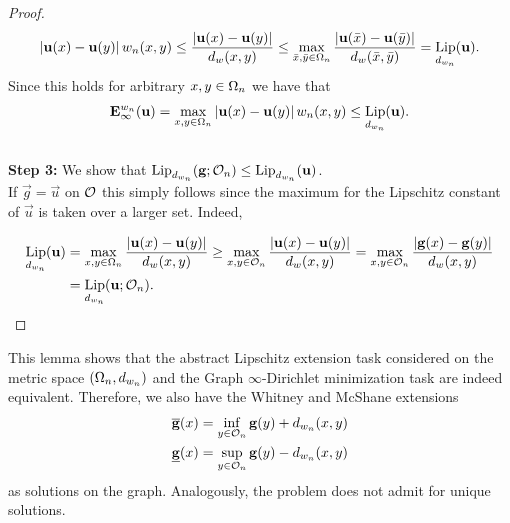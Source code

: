 \begin{proof}
%
\begin{align*}
\left|\mathbf{u}(x) - \mathbf{u}(y)\right| w_n(x,y)\leq 
\frac{\left|\mathbf{u}(x) - \mathbf{u}(y)\right|}{d_w(x,y)} \leq 
\max_{\bar{x}, \bar{y}\in\Omega_n}  
\frac{\left|\mathbf{u}(\bar x) - \mathbf{u}(\bar y)\right|}{d_w(\bar x,\bar y)} = \operatorname*{Lip}_{d_{w_n}}(\mathbf{u}).
\end{align*}
%
Since this holds for arbitrary $x,y\in\Omega_n$ we have that
%
\begin{align*}
\mathbf{E}^{w_n}_\infty(\mathbf{u}) = \max_{x,y\in\Omega_n} \left|\mathbf{u}(x) - \mathbf{u}(y)\right| w_n(x,y)
\leq
\operatorname*{Lip}_{d_{w_n}}(\mathbf{u}).
\end{align*}\\
\noindent%
\textbf{Step 3:} We show that $\operatorname*{Lip}_{d_{w_n}}(\mathbf{g};\mathcal{O}_n) \leq \operatorname*{Lip}_{d_{w_n}}(\mathbf{u})$.\\
%
If $\vec g = \vec u$ on $\mathcal{O}$ this simply follows since the maximum for the Lipschitz constant of $\vec u$ is taken over a larger set. Indeed,

\begin{align*}
\operatorname*{Lip}_{d_{w_n}}(\mathbf{u}) &= 
\max_{x,y\in\Omega_n} \frac{\left|\mathbf{u}(x) - \mathbf{u}(y)\right|}{d_w(x,y)}
\geq 
\max_{x,y\in\mathcal{O}_n} \frac{\left|\mathbf{u}(x) - \mathbf{u}(y)\right|}{d_w(x,y)}
=
\max_{x,y\in\mathcal{O}_n} \frac{\left|\mathbf{g}(x) - \mathbf{g}(y)\right|}{d_w(x,y)}\\
&=
\operatorname*{Lip}_{d_{w_n}}(\mathbf{u}; \mathcal{O}_n).
\end{align*}
\end{proof}
%
%
%
This lemma shows that the abstract Lipschitz extension task considered on the metric space $(\Omega_n, d_{w_n})$ and the Graph $\infty$-Dirichlet minimization task are indeed equivalent. Therefore, we also have the Whitney and McShane extensions
%
\begin{align*}
\overline{\mathbf{g}}(x) &= \inf_{y\in\mathcal{O}_n} \mathbf{g} (y) + d_{w_n}(x,y)\\
\underline{\mathbf{g}}(x) &= \sup_{y\in\mathcal{O}_n} \mathbf{g} (y) - d_{w_n}(x,y)
\end{align*}
%
as solutions on the graph. Analogously, the problem does not admit for unique solutions.
%
%
%
